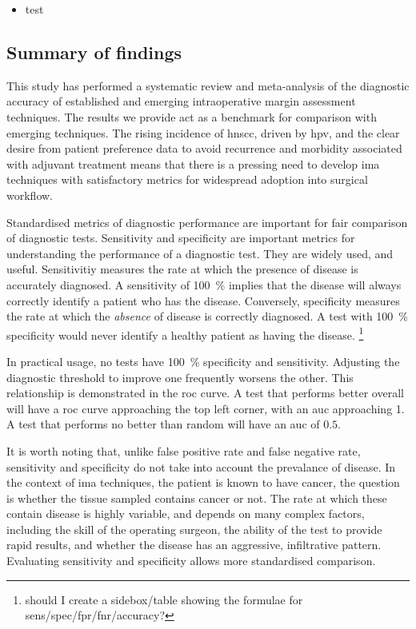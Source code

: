 \begin{itemize}
\item test
\end{itemize}

\subsection{Summary of findings}

This study has performed a systematic review and meta-analysis of the diagnostic accuracy of established and emerging intraoperative margin assessment techniques.
The results we provide act as a benchmark for comparison with emerging techniques.
The rising incidence of \gls{hnscc}, driven by \gls{hpv}, and the clear desire from patient preference data to avoid recurrence and morbidity associated with adjuvant treatment means that there is a pressing need to develop \gls{ima} techniques with satisfactory metrics for widespread adoption into surgical workflow.

Standardised metrics of diagnostic performance are important for fair comparison of diagnostic tests.
Sensitivity and specificity are important metrics for understanding the performance of a diagnostic test.
They are widely used, and useful.
Sensitivitiy measures the rate at which the presence of disease is accurately diagnosed. 
A sensitivity of \SI{100}{\percent} implies that the disease will always correctly identify a patient who has the disease.
Conversely, specificity measures the rate at which the \emph{absence} of disease is correctly diagnosed. 
A test with \SI{100}{\percent} specificity would never identify a healthy patient as having the disease.
\footnote{should I create a sidebox/table showing the formulae for sens/spec/fpr/fnr/accuracy?}

In practical usage, no tests have \SI{100}{\percent} specificity and sensitivity.
Adjusting the diagnostic threshold to improve one frequently worsens the other.
This relationship is demonstrated in the \gls{roc} curve.
A test that performs better overall will have a \gls{roc} curve approaching the top left corner, with an \gls{auc} approaching 1.
A test that performs no better than random will have an \gls{auc} of $0.5$.

It is worth noting that, unlike false positive rate and false negative rate, sensitivity and specificity do not take into account the prevalance of disease. 
In the context of \gls{ima} techniques, the patient is known to have cancer, the question is whether the tissue sampled contains cancer or not. 
The rate at which these contain disease is highly variable, and depends on many complex factors, including the skill of the operating surgeon, the ability of the test to provide rapid results, and whether the disease has an aggressive, infiltrative pattern.
Evaluating sensitivity and specificity allows more standardised comparison.


